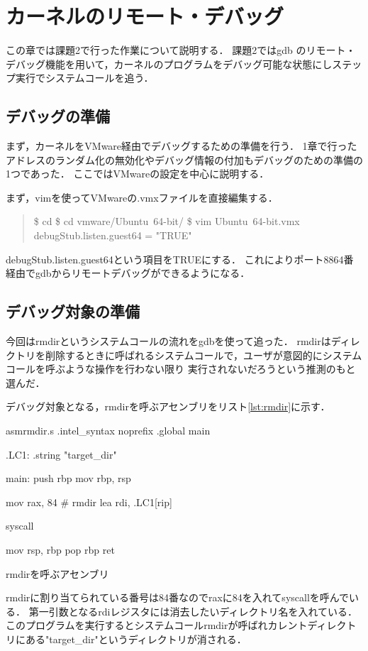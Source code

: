 \chapter{カーネルのリモート・デバッグ}
この章では課題2で行った作業について説明する．
課題2ではgdb のリモート・デバッグ機能を用いて，カーネルのプログラムをデバッグ可能な状態にしステップ実行でシステムコールを追う．

\section{デバッグの準備}
まず，カーネルをVMware経由でデバッグするための準備を行う．
1章で行ったアドレスのランダム化の無効化やデバッグ情報の付加もデバッグのための準備の1つであった．
ここではVMwareの設定を中心に説明する．

まず，vimを使ってVMwareの.vmxファイルを直接編集する．
\begin{quote}
\$ cd 
\$ cd vmware/Ubuntu\ 64-bit/
\$ vim Ubuntu\ 64-bit.vmx
debugStub.listen.guest64 = "TRUE"
\end{quote}

debugStub.listen.guest64という項目をTRUEにする．
これによりポート8864番経由でgdbからリモートデバッグができるようになる．

\section{デバッグ対象の準備}
今回はrmdirというシステムコールの流れをgdbを使って追った．
rmdirはディレクトリを削除するときに呼ばれるシステムコールで，ユーザが意図的にシステムコールを呼ぶような操作を行わない限り
実行されないだろうという推測のもと選んだ．

デバッグ対象となる，rmdirを呼ぶアセンブリをリスト\ref{lst:rmdir}に示す．
\begin{longlisting}
\begin{myminted}{asm}{rmdir.s}
.intel_syntax noprefix
.global main

.LC1:
    .string "target_dir"

main:
    push rbp
    mov rbp, rsp

    mov rax, 84 # rmdir
    lea rdi, .LC1[rip]

    syscall

    mov rsp, rbp
    pop rbp
    ret
\end{myminted}
    \caption{rmdirを呼ぶアセンブリ}
\label{lst:rmdir}
\end{longlisting}

rmdirに割り当てられている番号は84番\cite{syscall}なのでraxに84を入れてsyscallを呼んでいる．
第一引数となるrdiレジスタには消去したいディレクトリ名を入れている．
このプログラムを実行するとシステムコールrmdirが呼ばれカレントディレクトリにある"target_dir"というディレクトリが消される．

